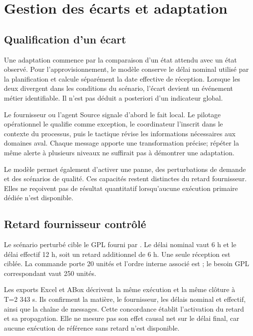 \chapter{Gestion des écarts et adaptation}
\label{chap:adaptation-aer}

\section{Qualification d'un écart}

Une adaptation commence par la comparaison d'un état attendu avec un état observé. Pour l'approvisionnement, le modèle conserve le délai nominal utilisé par la planification et calcule séparément la date effective de réception. Lorsque les deux divergent dans les conditions du scénario, l'écart devient un événement métier identifiable. Il n'est pas déduit a posteriori d'un indicateur global.

Le fournisseur ou l'agent Source signale d'abord le fait local. Le pilotage opérationnel le qualifie comme exception, le coordinateur l'inscrit dans le contexte du processus, puis le tactique révise les informations nécessaires aux domaines aval. Chaque message apporte une transformation précise; répéter la même alerte à plusieurs niveaux ne suffirait pas à démontrer une adaptation.

Le modèle permet également d'activer une panne, des perturbations de demande et des scénarios de qualité. Ces capacités restent distinctes du retard fournisseur. Elles ne reçoivent pas de résultat quantitatif lorsqu'aucune exécution primaire dédiée n'est disponible.

\section{Retard fournisseur contrôlé}

Le scénario perturbé cible le GPL fourni par . Le délai nominal vaut 6 h et le délai effectif 12 h, soit un retard additionnel de 6 h. Une seule réception est ciblée. La commande porte 20 unités et l'ordre interne associé est ; le besoin GPL correspondant vaut 250 unités.

Les exports Excel et ABox décrivent la même exécution et la même clôture à T=2 343 s. Ils confirment la matière, le fournisseur, les délais nominal et effectif, ainsi que la chaîne de messages. Cette concordance établit l'activation du retard et sa propagation. Elle ne mesure pas son effet causal net sur le délai final, car aucune exécution de référence sans retard n'est disponible.

